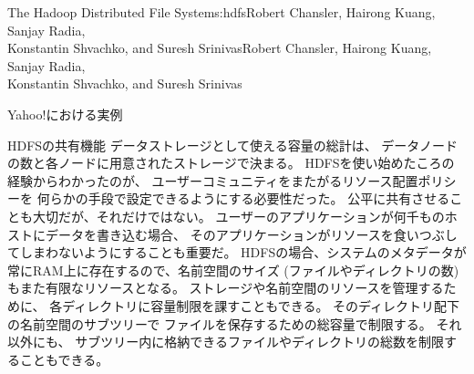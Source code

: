 \begin{aosachaptertoc}{The Hadoop Distributed File System}{s:hdfs}{Robert Chansler, Hairong Kuang, Sanjay Radia, \\ Konstantin Shvachko, and Suresh Srinivas}{Robert Chansler, Hairong Kuang, Sanjay Radia, \\ \hspace*{0.9cm} Konstantin Shvachko, and Suresh Srinivas}
\begin{aosasect1}{Yahoo!における実例}
\begin{aosasect2}{HDFSの共有機能}
データストレージとして使える容量の総計は、
データノードの数と各ノードに用意されたストレージで決まる。
HDFSを使い始めたころの経験からわかったのが、
ユーザーコミュニティをまたがるリソース配置ポリシーを
何らかの手段で設定できるようにする必要性だった。
公平に共有させることも大切だが、それだけではない。
ユーザーのアプリケーションが何千ものホストにデータを書き込む場合、
そのアプリケーションがリソースを食いつぶしてしまわないようにすることも重要だ。
HDFSの場合、システムのメタデータが常にRAM上に存在するので、名前空間のサイズ
(ファイルやディレクトリの数)もまた有限なリソースとなる。
ストレージや名前空間のリソースを管理するために、
各ディレクトリに容量制限を課すこともできる。
そのディレクトリ配下の名前空間のサブツリーで
ファイルを保存するための総容量で制限する。
それ以外にも、
サブツリー内に格納できるファイルやディレクトリの総数を制限することもできる。


\end{aosasect2}
\end{aosasect1}
\end{aosachaptertoc}
